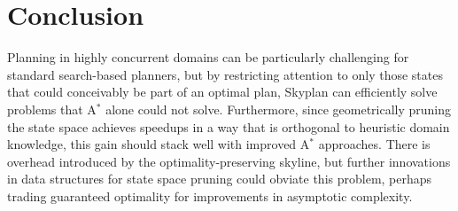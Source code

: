 \documentclass[letterpaper]{article}
\theoremstyle{plain} \newtheorem{theorem}{Theorem} \newtheorem{proposition}{Proposition} \newtheorem{lemma}{Lemma}
\theoremstyle{definition} \newtheorem{definition}{Definition} \newtheorem{conjecture}{Conjecture} \newtheorem*{example}{Example}
\theoremstyle{remark} \newtheorem*{remark}{Remark} \newtheorem*{note}{Note} \newtheorem{case}{Case}
\newcommand{\Astar}{A$^*$ }
\begin{document}
\section{Conclusion}

Planning in highly concurrent domains can be particularly challenging for standard
search-based planners, but by restricting attention to only those states that could
conceivably be part of an optimal plan, Skyplan can efficiently solve problems that
\Astar alone could not solve. Furthermore, since
geometrically pruning the state space achieves speedups in a way that is orthogonal to
heuristic domain knowledge, this gain should stack well with improved \Astar approaches. There
is overhead introduced by the optimality-preserving skyline, but further innovations in
data structures for state space pruning could obviate this problem, perhaps trading
guaranteed optimality for improvements in asymptotic complexity.



\end{document}
